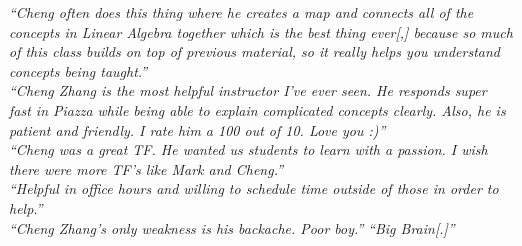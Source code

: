\documentclass[11pt,a4paper,sans]{moderncv} %
\begin{document}
\emph{``Cheng often does this thing where he creates a map and connects all of the concepts in Linear Algebra together which is the best thing ever[,] because so much of this class builds on top of previous material, so it really helps you understand concepts being taught.''}\\[3px]
\emph{``Cheng Zhang is the most helpful instructor I've ever seen. He responds super fast in Piazza while being able to explain complicated concepts clearly. Also, he is patient and friendly. I rate him a 100 out of 10. Love you :)''}\\[3px]
\emph{``Cheng was a great TF. He wanted us students to learn with a passion. I wish there were more TF's like Mark and Cheng.''}\\[3px]
\emph{``Helpful in office hours and willing to schedule time outside of those in order to help.''}\\[3px]
\emph{``Cheng Zhang's only weakness is his backache. Poor boy.''} 
\emph{``Big Brain[.]''}

\newpage
\printbibliography %
\end{document}
